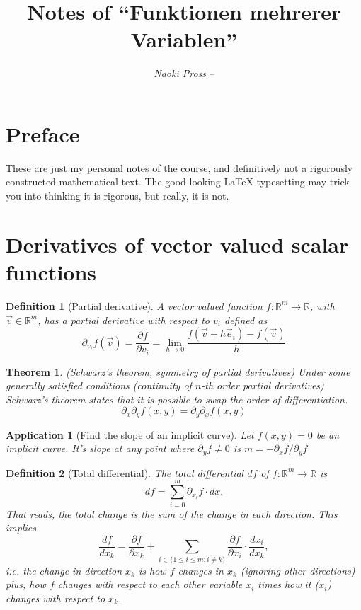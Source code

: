 \documentclass[twocolumn, margin=normal]{tex/hsrzf}
\author{\textsl{Naoki Pross} -- \texttt{\theauthoremail}}
\title{Notes of ``Funktionen mehrerer Variablen''}
\date{\thesemester}
\theoremstyle{fuvarzf}
\newtheorem{theorem}{Theorem}
\newtheorem{application}{Application}
\newtheorem{definition}{Definition}
\begin{document}
\maketitle

\section{Preface}

These are just my personal notes of the \themodule{} course, and definitively
not a rigorously constructed mathematical text. The good looking \LaTeX{}
typesetting may trick you into thinking it is rigorous, but really, it is not.

\section{Derivatives of vector valued scalar functions}

\begin{definition}[Partial derivative]
  A vector valued function \(f: \mathbb{R}^m\to\mathbb{R}\), with
  \(\vec{v}\in\mathbb{R}^m\), has a partial derivative with respect to \(v_i\)
  defined as
  \[
    \partial_{v_i} f(\vec{v})
      = \frac{\partial f}{\partial v_i}
      = \lim_{h\to 0} \frac{f(\vec{v} + h\vec{e}_i) - f(\vec{v})}{h}
  \]
\end{definition}

\begin{theorem}(Schwarz's theorem, symmetry of partial derivatives)
  Under some generally satisfied conditions (continuity of \(n\)-th order
  partial derivatives) Schwarz's theorem states that it is possible to swap
  the order of differentiation.
  \[
    \partial_x \partial_y f(x,y) = \partial_y \partial_x f(x,y)
  \]
\end{theorem}

\begin{application}[Find the slope of an implicit curve]
  Let \(f(x,y) = 0\) be an implicit curve. It's slope at any point where
  \(\partial_y f \neq 0\) is \(m = - \partial_x f / \partial_y f\)
\end{application}

\begin{definition}[Total differential]
  The total differential \(df\) of \(f:\mathbb{R}^m\to\mathbb{R}\) is
  \[
    df = \sum_{i=0}^m \partial_{x_i} f\cdot dx .
  \]
  That reads, the \emph{total} change is the sum of the change in each
  direction. This implies
  \[
    \frac{df}{dx_k} = \frac{\partial f}{\partial x_k} + 
      \sum_{i \in \{1 \leq i \leq m : i \neq k\}}
      \frac{\partial f}{\partial x_i} \cdot \frac{dx_i}{dx_k} ,
  \]
  i.e. the change in direction \(x_k\) is how \(f\) changes in \(x_k\)
  (ignoring other directions) plus, how \(f\) changes with respect to each
  other variable \(x_i\) times how it (\(x_i\)) changes with respect to \(x_k\).
\end{definition}
\end{document}
